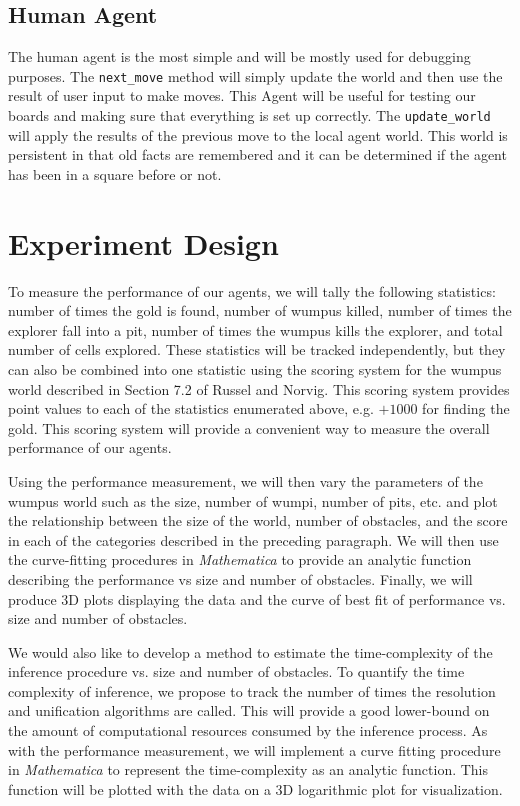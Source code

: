 \documentclass{article}
\begin{document}
		\subsection{Human Agent}
		 The human agent is the most simple and will be mostly used for debugging purposes. The \texttt{next\_move} method will simply update the world and then use the result of user input to make moves. This Agent will be useful for testing our boards and making sure that everything is set up correctly. The \texttt{update\_world} will apply the results of the previous move to the local agent world. This world is persistent in that old facts are remembered and it can be determined if the agent has been in a square before or not. 
	\section{Experiment Design}
	
	To measure the performance of our agents, we will tally the following statistics: number of times the gold is found, number of wumpus killed, number of times the explorer fall into a pit, number of times the wumpus kills the explorer, and total number of cells explored. These statistics will be tracked independently, but they can also be combined into one statistic using the scoring system for the wumpus world described in Section 7.2 of Russel and Norvig. This scoring system provides point values to each of the statistics enumerated above, e.g. $+1000$ for finding the gold. This scoring system will provide a convenient way to measure the overall performance of our agents.
	
	Using the performance measurement, we will then vary the parameters of the wumpus world such as the size, number of wumpi, number of pits, etc. and plot the relationship between the size of the world, number of obstacles, and the score in each of the categories described in the preceding paragraph. We will then use the curve-fitting procedures in \textit{Mathematica} to provide an analytic function describing the performance vs size and number of obstacles. Finally, we will produce 3D plots displaying the data and the curve of best fit of performance vs. size and number of obstacles.
	
	We would also like to develop a method to estimate the time-complexity of the inference procedure vs. size and number of obstacles.
	To quantify the time complexity of inference, we propose to track the number of times the resolution and unification algorithms are called. This will provide a good lower-bound on the amount of computational resources consumed by the inference process. As with the performance measurement, we will implement a curve fitting procedure in \textit{Mathematica} to represent the time-complexity as an analytic function. This function will be plotted with the data on a 3D logarithmic plot for visualization.
	
	
	

	




		
	
\end{document}
